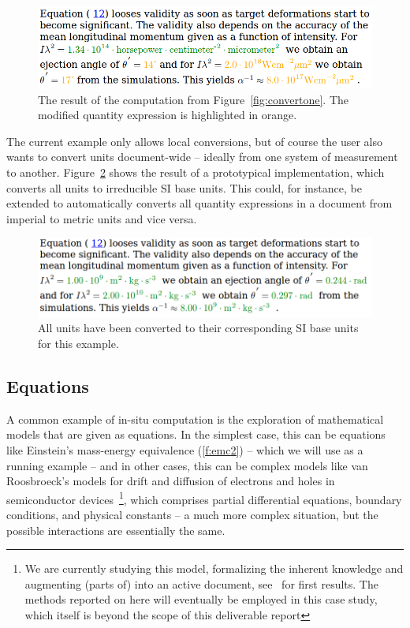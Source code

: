 \begin{figure}
\includegraphics[scale=0.3]{screenshots/convertoneresult.png}
\caption{The result of the computation from Figure~\ref{fig:convertone}. 
The modified quantity expression is highlighted in orange.}
\label{fig:convertoneresult}
\end{figure}

The current example only allows local conversions, but of course the user also wants
to convert units document-wide -- ideally from one system of measurement to another. 
Figure~\ref{fig:si} shows the result of a prototypical implementation, which 
converts all units to irreducible SI base units. 
This could, for instance, be extended to automatically converts all quantity
expressions in a document from imperial to metric units and vice versa. 

\begin{figure}
\includegraphics[scale=0.3]{screenshots/si.png}
\caption{All units have been converted to their corresponding SI base units for this example.}
\label{fig:si}
\end{figure}


\subsection{Equations}\label{sec:equations}

A common example of in-situ computation is the exploration of mathematical models that are
given as equations. In the simplest case, this can be equations like Einstein's
mass-energy equivalence (\ref{f:emc2}) -- which we will use as a running example -- and in
other cases, this can be complex models like van Roosbroeck's models for drift and
diffusion of electrons and holes in semiconductor devices~\cite{FarRotDoa:nmddm16}\footnote{We
  are currently studying this model, formalizing the inherent knowledge and augmenting
  (parts of) \cite{FarRotDoa:nmddm16} into an active document, see~\cite{KohKopMueTab:RCS} for
  first results. The methods reported on here will eventually be employed in this case
  study, which itself is beyond the scope of this deliverable report}, which comprises
partial differential equations, boundary conditions, and physical constants -- a much more
complex situation, but the possible interactions are essentially the same. 

